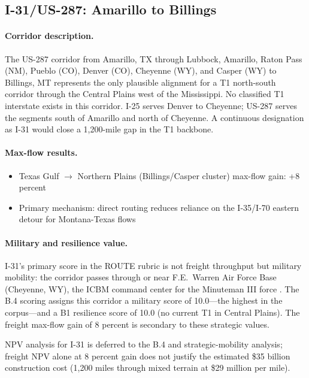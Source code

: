 \subsection{I-31/US-287: Amarillo to Billings}

\paragraph{Corridor description.} The US-287 corridor from Amarillo, TX through Lubbock, Amarillo, Raton Pass (NM), Pueblo (CO), Denver (CO), Cheyenne (WY), and Casper (WY) to Billings, MT represents the only plausible alignment for a T1 north-south corridor through the Central Plains west of the Mississippi. No classified T1 interstate exists in this corridor. I-25 serves Denver to Cheyenne; US-287 serves the segments south of Amarillo and north of Cheyenne. A continuous designation as I-31 would close a 1,200-mile gap in the T1 backbone.

\paragraph{Max-flow results.}
\begin{itemize}
  \item Texas Gulf $\to$ Northern Plains (Billings/Casper cluster) max-flow gain: +8 percent
  \item Primary mechanism: direct routing reduces reliance on the I-35/I-70 eastern detour for Montana-Texas flows
\end{itemize}

\paragraph{Military and resilience value.} I-31's primary score in the ROUTE rubric is not freight throughput but military mobility: the corridor passes through or near F.E.\ Warren Air Force Base (Cheyenne, WY), the ICBM command center for the Minuteman III force \citep{IIJA2021}. The B.4 scoring \citep{ROUTE_A1} assigns this corridor a military score of 10.0---the highest in the corpus---and a B1 resilience score of 10.0 (no current T1 in Central Plains). The freight max-flow gain of 8 percent is secondary to these strategic values.

NPV analysis for I-31 is deferred to the B.4 and strategic-mobility analysis; freight NPV alone at 8 percent gain does not justify the estimated \$35 billion construction cost (1,200 miles through mixed terrain at \$29 million per mile).
